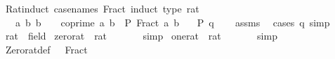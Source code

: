 \begin{isabellebody}
\ Rat{\isacharunderscore}{\kern0pt}induct\ {\isacharbrackleft}{\kern0pt}case{\isacharunderscore}{\kern0pt}names\ Fract{\isacharcomma}{\kern0pt}\ induct\ type{\isacharcolon}{\kern0pt}\ rat{\isacharbrackright}{\kern0pt}{\isacharcolon}{\kern0pt}\isanewline
\ \ \ {\isachardoublequoteopen}{\isasymAnd}a\ b{\isachardot}{\kern0pt}\ b\ {\isachargreater}{\kern0pt}\ {}\ {\isasymLongrightarrow}\ coprime\ a\ b\ {\isasymLongrightarrow}\ P\ {\isacharparenleft}{\kern0pt}Fract\ a\ b{\isacharparenright}{\kern0pt}{\isachardoublequoteclose}\isanewline
\ \ \ {\isachardoublequoteopen}P\ q{\isachardoublequoteclose}\isanewline
%
\isadelimproof
\ \ %
\endisadelimproof
%
\isatagproof
{}\isamarkupfalse%
\ assms\ \isamarkupfalse%
\ {\isacharparenleft}{\kern0pt}cases\ q{\isacharparenright}{\kern0pt}\ simp%
\endisatagproof
{\isafoldproof}%
%
\isadelimproof
\isanewline
%
\endisadelimproof
\isanewline
{}\isamarkupfalse%
\ rat\ {\isacharcolon}{\kern0pt}{\isacharcolon}{\kern0pt}\ field\isanewline
{}\isanewline
\isanewline
{}\isamarkupfalse%
\ zero{\isacharunderscore}{\kern0pt}rat\ {\isacharcolon}{\kern0pt}{\isacharcolon}{\kern0pt}\ {\isachardoublequoteopen}rat{\isachardoublequoteclose}\ \ {\isachardoublequoteopen}{\isacharparenleft}{\kern0pt}{}{\isacharcomma}{\kern0pt}\ {}{\isacharparenright}{\kern0pt}{\isachardoublequoteclose}\isanewline
%
\isadelimproof
\ \ %
\endisadelimproof
%
\isatagproof
{}\isamarkupfalse%
\ simp%
\endisatagproof
{\isafoldproof}%
%
\isadelimproof
\isanewline
%
\endisadelimproof
\isanewline
{}\isamarkupfalse%
\ one{\isacharunderscore}{\kern0pt}rat\ {\isacharcolon}{\kern0pt}{\isacharcolon}{\kern0pt}\ {\isachardoublequoteopen}rat{\isachardoublequoteclose}\ \ {\isachardoublequoteopen}{\isacharparenleft}{\kern0pt}{}{\isacharcomma}{\kern0pt}\ {}{\isacharparenright}{\kern0pt}{\isachardoublequoteclose}\isanewline
%
\isadelimproof
\ \ %
\endisadelimproof
%
\isatagproof
{}\isamarkupfalse%
\ simp%
\endisatagproof
{\isafoldproof}%
%
\isadelimproof
\isanewline
%
\endisadelimproof
\isanewline
{}\isamarkupfalse%
\ Zero{\isacharunderscore}{\kern0pt}rat{\isacharunderscore}{\kern0pt}def{\isacharcolon}{\kern0pt}\ {\isachardoublequoteopen}{}\ {\isacharequal}{\kern0pt}\ Fract\ {}\ {}{\isachardoublequoteclose}\isanewline

\end{isabellebody}
